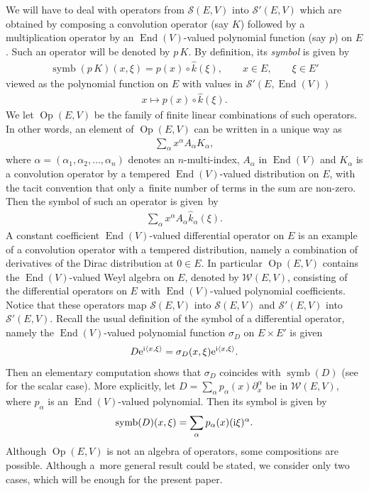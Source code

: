 \documentclass[10pt,a4paper]{amsart}
\DeclareMathOperator{\End}{End}
\DeclareMathOperator{\Op}{Op}
\DeclareMathOperator{\symb}{symb}
\numberwithin{equation}{section}
\begin{document}
We will have to deal with operators from $\mathcal S(E,V)$ into $\mathcal S'(E,V)$ which are obtained by composing a convolution operator (say $K$) followed by a multiplication operator by an $\End(V)$-valued polynomial function (say $p$) on $E$. Such an operator will be denoted by $p\,K$. By definition, its \emph{symbol} is given by
\begin{gather*}
\symb(p\,K) (x,\xi) = p(x)\circ \widehat k(\xi),\qquad x\in E,\qquad \xi\in E'
\end{gather*}
viewed as the polynomial function on $E$ with values in $\mathcal S'(E,\End(V))$
\begin{gather*}
x\mapsto p(x)\circ \widehat k(\xi) .
\end{gather*}
We let $\Op(E,V)$ be the family of finite linear combinations of such operators. In other words, an element of $\Op(E,V)$ can be written in a unique way as
\begin{gather*}
\sum_\alpha x^\alpha A_\alpha K_\alpha,
\end{gather*}
where $\alpha=(\alpha_1,\alpha_2,\dots, \alpha_n)$ denotes an $n$-multi-index, $A_\alpha$ in $\End(V)$ and $K_\alpha$ is a convolution operator by a tempered $\End(V)$-valued distribution on $E$, with the tacit convention that only a~finite number of terms in the sum are non-zero. Then the symbol of such an operator is given~by
\begin{gather*}
\sum_\alpha x^\alpha A_\alpha \widehat k_\alpha(\xi) .
\end{gather*}
A constant coefficient $\End(V)$-valued differential operator on $E$ is an example of a convolution operator with a tempered distribution, namely a combination of derivatives of the Dirac distribution at $0\in E$.
In particular $\Op(E,V)$ contains the $\End(V)$-valued Weyl algebra on $E$, denoted by $\mathcal W(E,V)$, consisting of the differential operators on $E$ with $\End(V)$-valued polynomial coef\-ficients. Notice that these operators map $\mathcal S(E,V)$ into $\mathcal S(E,V)$ and $\mathcal S'(E,V)$ into $\mathcal S'(E,V)$. Recall the usual definition of the symbol of a differential operator, namely the $\End(V)$-valued polynomial function $\sigma_D$ on $E\times E'$ is given
\begin{gather*}
D {\rm e}^{{\rm i}\langle x,\xi\rangle} = \sigma_D(x,\xi){\rm e}^{{\rm i}\langle x,\xi\rangle} .
\end{gather*}
Then an elementary computation shows that $\sigma_D$ coincides with $\symb(D)$ (see~\cite{c19} for the scalar case). More explicitly, let $D=\sum_\alpha p_\alpha(x) \partial_x^\alpha$ be in $\mathcal W(E,V)$, where $p_\alpha$ is an $\End(V)$-valued polynomial. Then its symbol is given by
\begin{gather*}
\symb(D)(x,\xi) = \sum_\alpha p_\alpha(x)({\rm i}\xi)^\alpha .
\end{gather*}
Although $\Op(E,V)$ is not an algebra of operators, some compositions are possible. Although a~more general result could be stated, we consider only two cases, which will be enough for the present paper.
\end{document}
